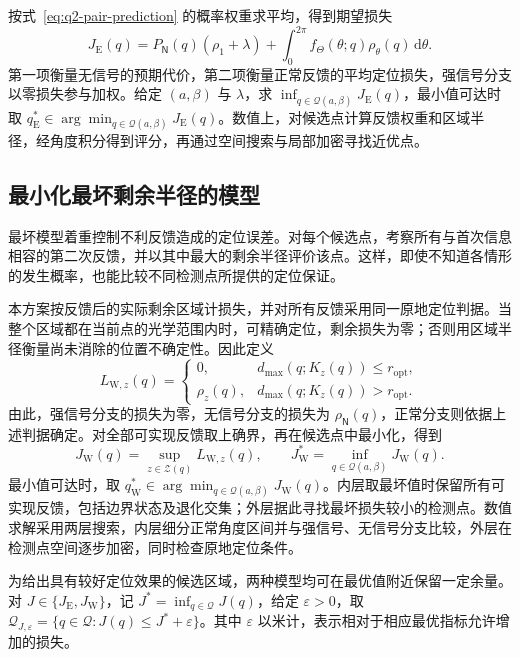 \documentclass[UTF8,a4paper,zihao=-4,fontset=none]{ctexart}
\begin{document}
按式~\eqref{eq:q2-pair-prediction} 的概率权重求平均，得到期望损失
\begin{equation}
 J_{\mathrm E}(q)
 =P_{\mathsf N}(q)(\rho_1+\lambda)
 +\int_0^{2\pi}f_\Theta(\theta;q)\rho_\theta(q)\,\mathrm d\theta.
\label{eq:q2-pair-expected-objective}
\end{equation}
第一项衡量无信号的预期代价，第二项衡量正常反馈的平均定位损失，强信号分支以零损失参与加权。给定 \((a,\beta)\) 与 \(\lambda\)，求 \(\inf_{q\in\mathcal Q(a,\beta)}J_{\mathrm E}(q)\)，最小值可达时取 \(q_{\mathrm E}^*\in\arg\min_{q\in\mathcal Q(a,\beta)}J_{\mathrm E}(q)\)。数值上，对候选点计算反馈权重和区域半径，经角度积分得到评分，再通过空间搜索与局部加密寻找近优点。

\subsection{最小化最坏剩余半径的模型}

最坏模型着重控制不利反馈造成的定位误差。对每个候选点，考察所有与首次信息相容的第二次反馈，并以其中最大的剩余半径评价该点。这样，即使不知道各情形的发生概率，也能比较不同检测点所提供的定位保证。

本方案按反馈后的实际剩余区域计损失，并对所有反馈采用同一原地定位判据。当整个区域都在当前点的光学范围内时，可精确定位，剩余损失为零；否则用区域半径衡量尚未消除的位置不确定性。因此定义
\begin{equation}
 L_{\mathrm W,z}(q)=
 \begin{cases}
 0,&d_{\max}(q;K_z(q))\le r_{\mathrm{opt}},\\
 \rho_z(q),&d_{\max}(q;K_z(q))>r_{\mathrm{opt}}.
 \end{cases}
\label{eq:q2-pair-worst-loss}
\end{equation}
由此，强信号分支的损失为零，无信号分支的损失为 \(\rho_{\mathsf N}(q)\)，正常分支则依据上述判据确定。对全部可实现反馈取上确界，再在候选点中最小化，得到
\begin{equation}
 J_{\mathrm W}(q)=\sup_{z\in\mathcal Z(q)}L_{\mathrm W,z}(q),
 \qquad J_{\mathrm W}^*=\inf_{q\in\mathcal Q(a,\beta)}J_{\mathrm W}(q).
\label{eq:q2-pair-worst-objective}
\end{equation}
最小值可达时，取 \(q_{\mathrm W}^*\in\arg\min_{q\in\mathcal Q(a,\beta)}J_{\mathrm W}(q)\)。内层取最坏值时保留所有可实现反馈，包括边界状态及退化交集；外层据此寻找最坏损失较小的检测点。数值求解采用两层搜索，内层细分正常角度区间并与强信号、无信号分支比较，外层在检测点空间逐步加密，同时检查原地定位条件。

为给出具有较好定位效果的候选区域，两种模型均可在最优值附近保留一定余量。对 \(J\in\{J_{\mathrm E},J_{\mathrm W}\}\)，记 \(J^*=\inf_{q\in\mathcal Q}J(q)\)，给定 \(\varepsilon>0\)，取 \(\mathcal Q_{J,\varepsilon}=\{q\in\mathcal Q:J(q)\le J^*+\varepsilon\}\)。其中 \(\varepsilon\) 以米计，表示相对于相应最优指标允许增加的损失。
\end{document}
